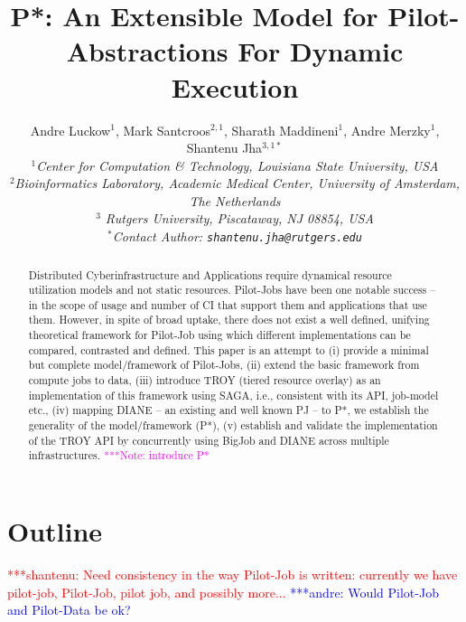 \documentclass[conference,final]{IEEEtran}
\title{P*: An Extensible Model for Pilot-Abstractions For Dynamic Execution}
\date{}
\newcommand{\jhanote}[1]{ {\textcolor{red} { ***shantenu: #1 }}}
\newcommand{\alnote}[1]{ {\textcolor{blue} { ***andre: #1 }}}
\newcommand{\note}[1]{ {\textcolor{magenta} { ***Note: #1 }}}
\newcommand{\alnote}[1]{}
\newcommand{\jhanote}[1]{}
\newcommand{\note}[1]{}
\newcommand{\up}{\vspace*{-1em}}
\begin{document}
\ifpdf
{}
\else
{}
\fi

\author{
  Andre Luckow$^{1}$, Mark Santcroos$^{2,1}$, Sharath Maddineni$^{1}$, Andre Merzky$^{1}$, Shantenu Jha$^{3,1*}$\\
  \small{\emph{$^{1}$Center for Computation \& Technology, Louisiana State University, USA}}\\
 \small{\emph{$^{2}$Bioinformatics Laboratory, Academic Medical Center, University of Amsterdam, The Netherlands}}\\
 \small{\emph{$^{3}$ Rutgers University, Piscataway, NJ 08854, USA}}\\
  \small{\emph{$^{*}$Contact Author: \texttt{shantenu.jha@rutgers.edu}}}\\
  \up\up\up\up }

\maketitle

\begin{abstract}
  Distributed Cyberinfrastructure and Applications require dynamical
  resource utilization models and not static resources.  Pilot-Jobs
  have been one notable success -- in the scope of usage and number of
  CI that support them and applications that use them.  However, in
  spite of broad uptake, there does not exist a well defined, unifying
  theoretical framework for Pilot-Job using which different
  implementations can be compared, contrasted and defined. This paper
  is an attempt to (i) provide a minimal but complete model/framework
  of Pilot-Jobs, (ii) extend the basic framework from compute jobs to
  data, (iii) introduce TROY (tiered resource overlay) as an
  implementation of this framework using SAGA, i.e., consistent with
  its API, job-model etc., (iv) mapping DIANE -- an existing and well
  known PJ -- to P*, we establish the generality of the
  model/framework (P*), (v) establish and validate the implementation
  of the TROY API by concurrently using BigJob and DIANE across
  multiple infrastructures.
\note{introduce P*}
\end{abstract}

\section*{Outline}

\jhanote{Need consistency in the way Pilot-Job is written: currently
  we have pilot-job, Pilot-Job, pilot job, and possibly more...}
\alnote{Would Pilot-Job and Pilot-Data be ok?}
\end{document}
